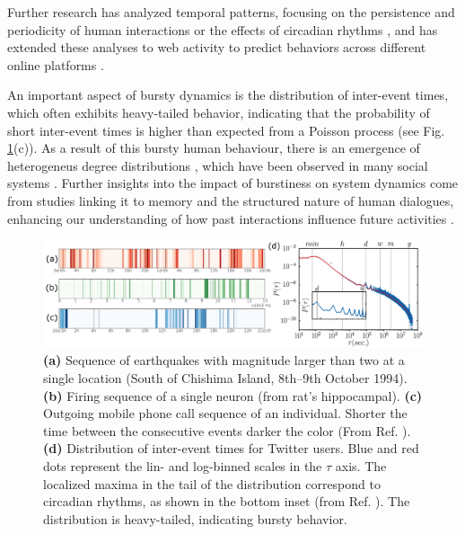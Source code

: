 Further research has analyzed temporal patterns, focusing on the persistence and periodicity of human interactions \cite{Clauset2007Proximity} or the effects of circadian rhythms \cite{Jo2012Circadian}, and has extended these analyses to web activity to predict behaviors across different online platforms \cite{Radicchi2009WebActivity}.

An important aspect of bursty dynamics is the distribution of inter-event times, which often exhibits heavy-tailed behavior, indicating that the probability of short inter-event times is higher than expected from a Poisson process (see Fig. \ref{fig:bursty_human_dynamics}(c)). As a result of this bursty human behaviour, there is an emergence of heterogeneus degree distributions \cite{Muchnik2013PowerLaw}, which have been observed in many social systems \cite{barabasi2009scale}. Further insights into the impact of burstiness on system dynamics come from studies linking it to memory and the structured nature of human dialogues, enhancing our understanding of how past interactions influence future activities \cite{karsai2012universal, Goh2008Burstiness, Eckmann2004Entropy}.

\begin{figure}
    \centering
    \captionsetup{font=sf}
    \includegraphics[width=\textwidth]{Figs/Introduction/bursty.png}
    \caption[Bursty human dynamics: examples and distribution]{\textbf{(a)} Sequence of earthquakes with magnitude larger than two at a single location (South of Chishima Island, 8th–9th October 1994). \textbf{(b)} Firing sequence of a single neuron (from rat's hippocampal). \textbf{(c)} Outgoing mobile phone call sequence of an individual. Shorter the time between the consecutive events darker the color (From Ref. \cite{karsai2012universal}). \textbf{(d)} Distribution of inter-event times for Twitter users. Blue and red dots represent the lin- and log-binned scales in the $\tau$ axis. The localized maxima in the tail of the distribution correspond to circadian rhythms, as shown in the bottom inset  (from Ref. \cite{artime-2017}). The distribution is heavy-tailed, indicating bursty behavior.}
    \label{fig:bursty_human_dynamics}
\end{figure}

